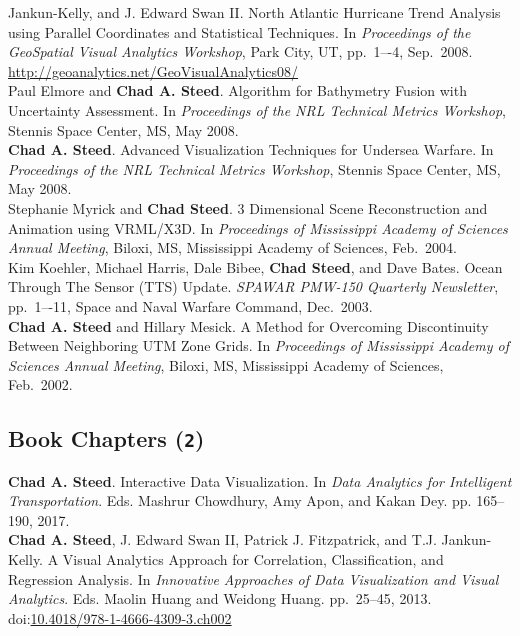 \documentclass[11pt, letterpaper]{article}
\newcommand{\years}[1]{\marginnote{\scriptsize #1}}
\begin{document}
\begin{sloppypar}
Jankun-Kelly, and J. Edward Swan II. North Atlantic Hurricane Trend Analysis
using Parallel Coordinates and Statistical Techniques.  In \emph{Proceedings of
the GeoSpatial Visual Analytics Workshop}, Park City, UT, pp.\ 1–-4, Sep.\ 2008.
\href{http://geoanalytics.net/GeoVisualAnalytics08/}
{http://geoanalytics.net/GeoVisualAnalytics08/}\\
\years{2008}Paul Elmore and \textbf{Chad A. Steed}.  Algorithm for Bathymetry
Fusion with Uncertainty Assessment.  In \emph{Proceedings of the NRL Technical
Metrics Workshop}, Stennis Space Center, MS, May 2008.\\
\years{2008}\textbf{Chad A. Steed}.  Advanced Visualization Techniques for
Undersea Warfare. In \emph{Proceedings of the NRL Technical Metrics Workshop},
Stennis Space Center, MS, May 2008. \\
\years{2004}Stephanie Myrick and \textbf{Chad Steed}. 3 Dimensional Scene
Reconstruction and Animation using VRML/X3D.  In \emph{Proceedings of
Mississippi Academy of Sciences Annual Meeting}, Biloxi, MS, Mississippi
Academy of Sciences, Feb.\ 2004.\\
\years{2003}Kim Koehler, Michael Harris, Dale Bibee, \textbf{Chad Steed},
and Dave Bates.  Ocean Through The Sensor (TTS) Update.  \emph{SPAWAR PMW-150
Quarterly Newsletter}, pp.\ 1–-11, Space and Naval Warfare Command, Dec.\ 2003.\\
\years{2002}\textbf{Chad A. Steed} and Hillary Mesick. A Method for Overcoming
Discontinuity Between Neighboring UTM Zone Grids.  In \emph{Proceedings of
Mississippi Academy of Sciences Annual Meeting}, Biloxi, MS, Mississippi
Academy of Sciences, Feb.\ 2002.
\end{sloppypar}

\subsection*{Book Chapters (\texttt{2})}
\noindent\years{2016}\textbf{Chad A. Steed}. Interactive Data Visualization.
In \emph{Data Analytics for Intelligent Transportation}. Eds. Mashrur
Chowdhury, Amy Apon, and Kakan Dey. pp. 165--190, 2017.\\
\years{2013}\textbf{Chad A. Steed}, J. Edward Swan II,
Patrick J. Fitzpatrick, and T.J. Jankun-Kelly.  A Visual Analytics Approach
for Correlation, Classification, and Regression Analysis. In \emph{Innovative Approaches
of Data Visualization and Visual Analytics}. Eds. Maolin Huang and Weidong Huang. pp.\ 25--45, 2013.
doi:\href{http://dx.doi.org/10.4018/978-1-4666-4309-3.ch002}{10.4018/978-1-4666-4309-3.ch002}
\end{document}
